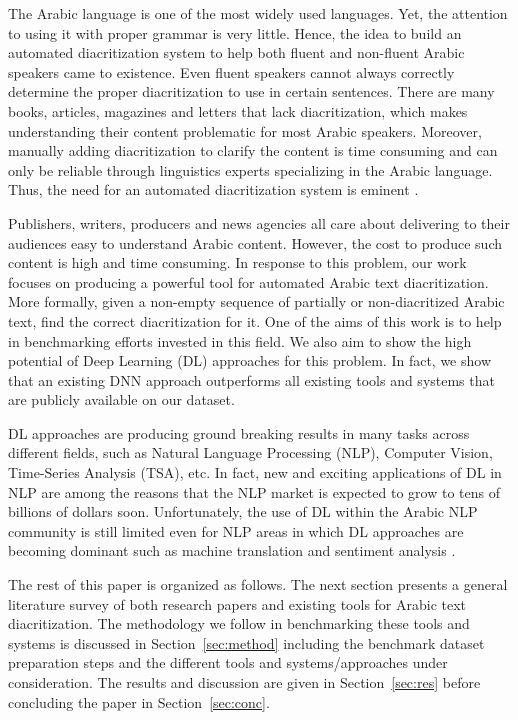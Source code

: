\documentclass[conference]{IEEEtran}
\begin{document}
The Arabic language is one of the most widely used languages. Yet, the attention to using it with proper grammar is very little. Hence, the idea to build an automated diacritization system to help both fluent and non-fluent Arabic speakers came to existence. Even fluent speakers cannot always correctly determine the proper diacritization to use in certain sentences. There are many books, articles, magazines and letters that lack diacritization, which makes understanding their content problematic for most Arabic speakers. Moreover, manually adding diacritization to clarify the content is time consuming and can only be reliable through linguistics experts specializing in the Arabic language. Thus, the need for an automated diacritization system is eminent \cite{abandah2015automatic,belinkov2015arabic}.



Publishers, writers, producers and news agencies all care about delivering to their audiences easy to understand Arabic content. However, the cost to produce such content is high and time consuming.
In response to this problem, our work focuses on producing a powerful tool for automated Arabic text diacritization.
More formally, given a non-empty sequence of partially or non-diacritized Arabic text, find the correct diacritization for it. One of the aims of this work is to help in benchmarking efforts invested in this field. We also aim to show the high potential of Deep Learning (DL) approaches for this problem. In fact, we show that an existing DNN approach outperforms all existing tools and systems that are publicly available on our dataset.

DL approaches are producing ground breaking results in many tasks across different fields, such as Natural Language Processing (NLP), Computer Vision, Time-Series Analysis (TSA), etc. In fact, new and exciting applications of DL in NLP are among the reasons that the NLP market is expected to grow to tens of billions of dollars soon. Unfortunately, the use of DL within the Arabic NLP community is still limited even for NLP areas in which DL approaches are becoming dominant such as machine translation and sentiment analysis \cite{special_issue}.

The rest of this paper is organized as follows.
The next section presents a general literature survey of both research papers and existing tools for Arabic text diacritization.
The methodology we follow in benchmarking these tools and systems is discussed in Section~\ref{sec:method} including the benchmark dataset preparation steps and the different tools and systems/approaches under consideration. The results and discussion are given in Section~\ref{sec:res} before concluding the paper in Section~\ref{sec:conc}.
\end{document}
